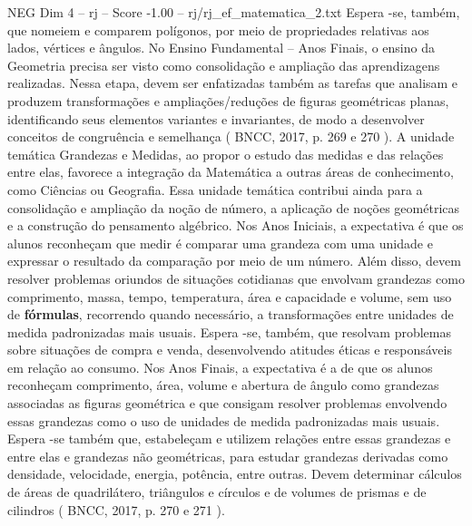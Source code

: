 \begin{textsample}{NEG Dim 4 – rj – Score -1.00 – rj/rj\_ef\_matematica\_2.txt}
Espera -se, também, que nomeiem e comparem polígonos, por meio de propriedades relativas aos lados, vértices e ângulos.
No Ensino Fundamental – Anos Finais, o ensino da Geometria precisa ser visto como consolidação e ampliação das aprendizagens realizadas.
Nessa etapa, devem ser enfatizadas também as tarefas que analisam e produzem transformações e ampliações/reduções de figuras geométricas planas, identificando seus elementos variantes e invariantes, de modo a desenvolver conceitos de congruência e semelhança ( BNCC, 2017, p. 269 e 270 ).
A unidade temática Grandezas e Medidas, ao propor o estudo das medidas e das relações entre elas, favorece a integração da Matemática a outras áreas de conhecimento, como Ciências ou Geografia.
Essa unidade temática contribui ainda para a consolidação e ampliação da noção de número, a aplicação de noções geométricas e a construção do pensamento algébrico.
Nos Anos Iniciais, a expectativa é que os alunos reconheçam que medir é comparar uma grandeza com uma unidade e expressar o resultado da comparação por meio de um número.
Além disso, devem resolver problemas oriundos de situações cotidianas que envolvam grandezas como comprimento, massa, tempo, temperatura, área e capacidade e volume, sem uso de \textbf{fórmulas}, recorrendo quando necessário, a transformações entre unidades de medida padronizadas mais usuais.
Espera -se, também, que resolvam problemas sobre situações de compra e venda, desenvolvendo atitudes éticas e responsáveis em relação ao consumo.
Nos Anos Finais, a expectativa é a de que os alunos reconheçam comprimento, área, volume e abertura de ângulo como grandezas associadas as figuras geométrica e que consigam resolver problemas envolvendo essas grandezas como o uso de unidades de medida padronizadas mais usuais.
Espera -se também que, estabeleçam e utilizem relações entre essas grandezas e entre elas e grandezas não geométricas, para estudar grandezas derivadas como densidade, velocidade, energia, potência, entre outras.
Devem determinar cálculos de áreas de quadrilátero, triângulos e círculos e de volumes de prismas e de cilindros ( BNCC, 2017, p. 270 e 271 ).

\end{textsample}
